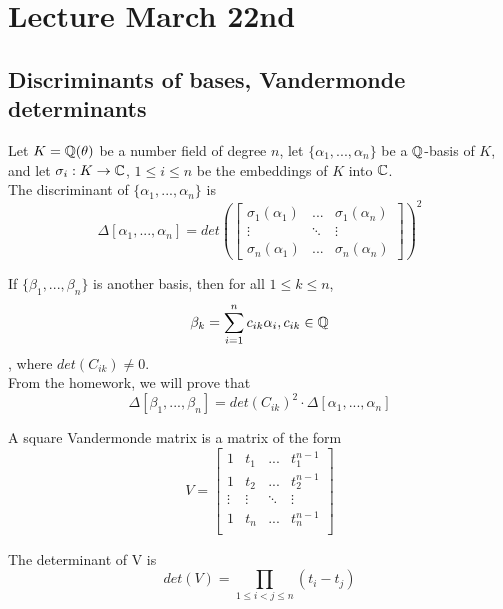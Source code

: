 \section{Lecture March 22nd}

\subsection{Discriminants of bases, Vandermonde determinants}

Let $K = \mathbb{Q}(\theta)$ be a number field of degree $n$, let $\{\alpha_1, ..., \alpha_n\}$ be a $\mathbb{Q}$-basis of $K$, and let $\sigma_i: K \to \mathbb{C}$, $1 \leq i \leq n$ be the embeddings of $K$ into $\mathbb{C}$.\\

\noindent The discriminant of $\{\alpha_1, ..., \alpha_n\}$ is 
\[\Delta[\alpha_1, ..., \alpha_n] = det(\begin{bmatrix} \sigma_1(\alpha_1) & ... & \sigma_1(\alpha_n)\\
\vdots & \ddots & \vdots \\
\sigma_n(\alpha_1) & ... & \sigma_n(\alpha_n)
\end{bmatrix})^2\]

\noindent If $\{\beta_1, ..., \beta_n\}$ is another basis, then for all $1 \leq k \leq n$,
\[\beta_k = \sum_{i = 1}^n c_{ik} \alpha_i, c_{ik} \in \mathbb{Q}\]
, where $det(C_{ik}) \neq 0$.\\

\noindent From the homework, we will prove that
\[\Delta[\beta_1, ..., \beta_n] = det(C_{ik})^2 \cdot \Delta[\alpha_1, ..., \alpha_n]\]

\begin{definition}
A square Vandermonde matrix is a matrix of the form
\[V = \begin{bmatrix}
1 & t_1 & ... & t_1^{n-1}\\
1 & t_2 & ... & t_2^{n-1}\\
\vdots & \vdots & \ddots & \vdots\\
1 & t_n & ... & t_n^{n-1}\\
\end{bmatrix}\]
\end{definition}

\begin{proposition}
The determinant of V is
\[det(V) = \prod_{1 \leq i < j \leq n} (t_i - t_j)\]
\end{proposition}

